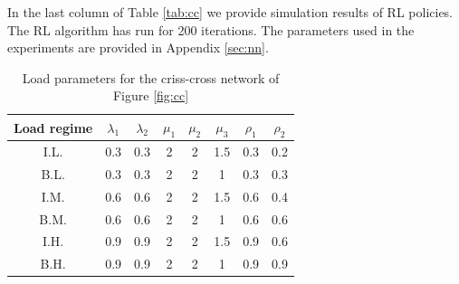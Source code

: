 \documentclass[11pt]{article}
\theoremstyle{definition}
\numberwithin{equation}{section}
\begin{document}



In the last column of Table \ref{tab:cc} we provide simulation results of RL policies. The RL algorithm has run for 200 iterations. The parameters used in
the experiments are provided in Appendix \ref{sec:nn}.






\begin{table}[H]
\centering
\begin{tabular}{|c|c|c|c|c|c|c|c|}
  \hline
  Load regime  & $\lambda_1$ & $\lambda_2 $ & $\mu_1$ & $\mu_2$ & $\mu_3$ & $\rho_1$ & $\rho_2$\\\hline
  I.L. & 0.3 & 0.3& 2 & 2 &1.5& 0.3&0.2\\\hline
  B.L. & 0.3 & 0.3 & 2 & 2 &1 &0.3&0.3\\\hline
  I.M. & 0.6 & 0.6  & 2 & 2 &1.5& 0.6&0.4\\\hline
  B.M. & 0.6 & 0.6  & 2 & 2 &1& 0.6&0.6\\\hline
  I.H. & 0.9 & 0.9 & 2 & 2 &1.5& 0.9&0.6\\\hline
  B.H. & 0.9 & 0.9 & 2 & 2&1&0.9&0.9 \\

  \hline


\end{tabular}
 \caption[]{Load parameters for the criss-cross network of Figure \ref{fig:cc}
 }\label{t:lp}
\end{table}
\end{document}
